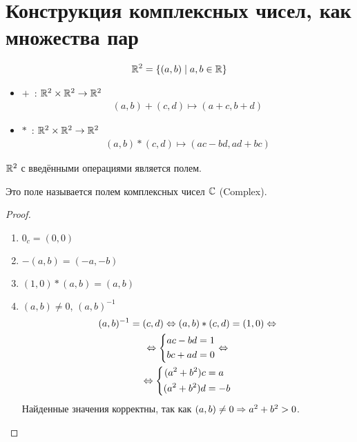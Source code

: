 \section{Конструкция комплексных чисел, как множества пар}
\begin{gather*}
\mathbb{R}^2 = \{(a, b) \mid a, b \in \mathbb{R}\}
\end{gather*}
\begin{itemize} 
\item $+$~: $\mathbb{R}^2 \times \mathbb{R}^2 \rightarrow \mathbb{R}^2$
\begin{gather*}
(a, b) + (c, d) \mapsto (a + c, b + d)
\end{gather*}
\item $*$~: $\mathbb{R}^2 \times \mathbb{R}^2 \rightarrow \mathbb{R}^2$
\begin{gather*}
(a, b)*(c, d) \mapsto (ac - bd, ad + bc)
\end{gather*}
\end{itemize}
\begin{theorem}{}
$\mathbb{R}^2$ с введёнными операциями является полем.
\end{theorem}
\begin{Def}
Это поле называется полем комплексных чисел $\mathbb{C}$ (Complex).
\end{Def}
\begin{proof}
\begin{enumerate}
\item $0_c = (0, 0)$
\item $-(a, b) = (-a, -b) $
\item $(1, 0) * (a, b) = (a, b) $
\item$ (a, b) \ne 0$, $(a, b)^{-1}$
\begin{gather*}
(a, b)^{-1} = (c, d) \Leftrightarrow (a, b)*(c, d) = (1, 0) \Leftrightarrow \\
\Leftrightarrow \left\{\begin{aligned}
ac - bd &= 1 \\
bc + ad &= 0 \\
\end{aligned}\right.\Leftrightarrow \\
\Leftrightarrow \left\{\begin{aligned}
(a^2 + b^2) c &= a \\
(a^2 + b^2) d &= -b
\end{aligned}\right.
\end{gather*}
Найденные значения корректны, так как $(a, b) \ne 0 \Rightarrow a^2 + b^2 > 0$.
\end{enumerate}
\end{proof}
